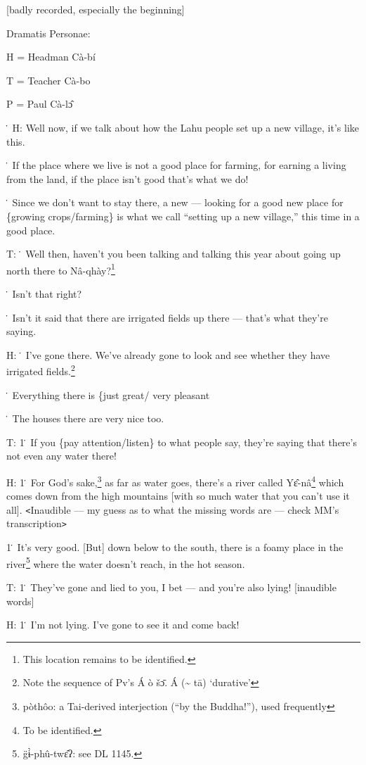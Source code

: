 
[badly recorded, especially the beginning]

Dramatis Personae:

H = Headman Cà-bí

T = Teacher Cà-bo

P = Paul Cà-lɔ̂

\. H: Well now, if we talk about how the Lahu people set up a new village, it's
like this.

\. If the place where we live is not a good place for farming, for earning a living
from the land, if the place isn't good that's what we do!

\. Since we don't want to stay there, a new --- looking for a good new place for
\{growing crops/farming\} is what we call ``setting up a new village,'' this time
in a good place.

T: \. Well then, haven't you been talking and talking this year about going up
north there to Nâ-qhày?\footnote{This location remains to be identified.}

\. Isn't that right?

\. Isn't it said that there are irrigated fields up there --- that's what they're
saying.

H: \. I've gone there. We've already gone to look and see whether they have irrigated
fields.\footnote{Note the sequence of Pv's Á ò šɔ̄. Á (\textasciitilde{} tā) `durative'}

\. Everything there is \{just great/ very pleasant

\. The houses there are very nice too.

T: 1\. If you \{pay attention/listen\} to what people say, they're saying that
there's not even any water there!

H: 1\. For God's sake,\footnote{pòthôo: a Tai-derived interjection (``by the Buddha!''), used frequently} as far as water goes, there's a river called Yɛ̂-nâ\footnote{To be identified.}
which comes down from the high mountains [with so much water that you can't use
it all]. \texttt{<}Inaudible --- my guess as to what the missing words are ---
check MM's transcription\texttt{>}

1\. It's very good. [But] down below to the south, there is a foamy place in the
river\footnote{g̈ɨ̀-phû-twɛ̂ʔ: see DL 1145.} where the water doesn't reach, in the hot season.

T: 1\. They've gone and lied to you, I bet --- and you're also lying! [inaudible
words]

H: 1\. I'm not lying. I've gone to see it and come back!

